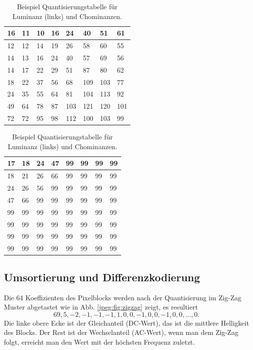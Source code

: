 \begin{table}[b]
    \centering
    \begin{tabularx}{0.47\linewidth}{|X|X|X|X|X|X|X|X|}
        \hline
        16 & 11 & 10 & 16 & 24  & 40 & 51 & 61    \\ \hline
        12 & 12 & 14 & 19 & 26  & 58 & 60 & 55    \\ \hline
        14 & 13 & 16 & 24 & 40  & 57 & 69 & 56    \\ \hline
        14 & 17 & 22 & 29 & 51  & 87 & 80 & 62    \\ \hline
        18 & 22 & 37 & 56 & 68  & 109 & 103 & 77  \\ \hline
        24 & 35 & 55 & 64 & 81  & 104 & 113 & 92  \\ \hline
        49 & 64 & 78 & 87 & 103 & 121 & 120 & 101 \\ \hline
        72 & 72 & 95 & 98 & 112 & 100 & 103 & 99  \\ \hline        
    \end{tabularx}
    \qquad
    \begin{tabularx}{0.47\linewidth}{|X|X|X|X|X|X|X|X|}
        \hline
        17 & 18 & 24 & 47 & 99 & 99 & 99 & 99  \\ \hline
        18 & 21 & 26 & 66 & 99 & 99 & 99 & 99  \\ \hline
        24 & 26 & 56 & 99 & 99 & 99 & 99 & 99  \\ \hline
        47 & 66 & 99 & 99 & 99 & 99 & 99 & 99  \\ \hline
        99 & 99 & 99 & 99 & 99 & 99 & 99 & 99  \\ \hline
        99 & 99 & 99 & 99 & 99 & 99 & 99 & 99  \\ \hline
        99 & 99 & 99 & 99 & 99 & 99 & 99 & 99  \\ \hline
        99 & 99 & 99 & 99 & 99 & 99 & 99 & 99  \\ \hline  	  
    \end{tabularx}
    \caption{Beispiel Quantisierungstabelle für Luminanz (links) und Chominanzen.
        \label{jpeg:tab:quant}}
\end{table}



\subsection{Umsortierung und Differenzkodierung
\label{jpeg:subsection:umsortierung}}
Die 64 Koeffizienten des Pixelblocks werden nach der Quantisierung im Zig-Zag Muster abgetastet wie in Abb. \ref{jpeg:fig:zigzag} zeigt, es resultiert
\begin{equation}
    69, 5, -2, -1, -1, -1, 1, 0, 0, -1, 0, 0, -1, 0, 0,\dots, 0.
    \label{jpeg:equation:abgetastet}
\end{equation}
Die linke obere Ecke ist der Gleichanteil (DC-Wert), das ist die mittlere Helligkeit des Blocks.
Der Rest ist der Wechselanteil (AC-Wert), wenn man dem Zig-Zag folgt, erreicht man den Wert mit der höchsten Frequenz zuletzt.

